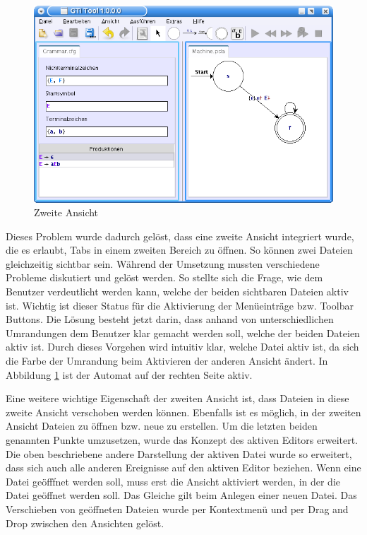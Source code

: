 \begin{figure}[h!]
\begin{center}
\includegraphics[width=12cm]{../images/second_view.png}
\caption{Zweite Ansicht}
\label{FigureSecondView}
\end{center}
\end{figure}
\vspace{10pt}

Dieses Problem wurde dadurch gelöst, dass eine zweite Ansicht integriert wurde,
die es erlaubt, Tabs in einem zweiten Bereich zu öffnen. So können zwei Dateien
gleichzeitig sichtbar sein. Während der Umsetzung mussten verschiedene Probleme
diskutiert und gelöst werden. So stellte sich die Frage, wie dem Benutzer
verdeutlicht werden kann, welche der beiden sichtbaren Dateien aktiv ist. Wichtig
ist dieser Status für die Aktivierung der Menüeinträge bzw. Toolbar Buttons. Die
Lösung besteht jetzt darin, dass anhand von unterschiedlichen Umrandungen dem
Benutzer klar gemacht werden soll, welche der beiden Dateien aktiv ist. Durch
dieses Vorgehen wird intuitiv klar, welche Datei aktiv ist, da sich die Farbe der
Umrandung beim Aktivieren der anderen Ansicht ändert. In Abbildung
\ref{FigureSecondView} ist der Automat auf der rechten Seite aktiv.\vspace{10pt}

Eine weitere wichtige Eigenschaft der zweiten Ansicht ist, dass Dateien in diese
zweite Ansicht verschoben werden können. Ebenfalls ist es möglich, in der zweiten
Ansicht Dateien zu öffnen bzw. neue zu erstellen. Um die letzten beiden genannten
Punkte umzusetzen, wurde das Konzept des aktiven Editors erweitert. Die oben
beschriebene andere Darstellung der aktiven Datei wurde so erweitert, dass sich
auch alle anderen Ereignisse auf den aktiven Editor beziehen. Wenn eine Datei
geöfffnet werden soll, muss erst die Ansicht aktiviert werden, in der die Datei
geöffnet werden soll. Das Gleiche gilt beim Anlegen einer neuen Datei. Das
Verschieben von geöffneten Dateien wurde per Kontextmenü und per Drag and Drop
zwischen den Ansichten gelöst.\vspace{10pt}


